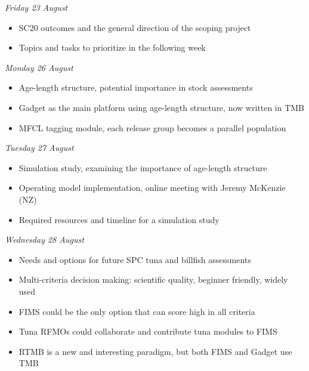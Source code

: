\documentclass{SCreport}
\begin{document}
\vspace{1ex}

\textit{Friday 23 August}\\[-4ex]

\begin{itemize}
  \item[] SC20 outcomes and the general direction of the scoping
  project\\[-4.5ex]
  \item[] Topics and tasks to prioritize in the following week\\[-2.5ex]
\end{itemize}

\textit{Monday 26 August}\\[-4ex]

\begin{itemize}
  \item[] Age-length structure, potential importance in stock
  assessments\\[-4.5ex]
  \item[] Gadget as the main platform using age-length structure, now written in
  TMB\\[-4.5ex]
  \item[] MFCL tagging module, each release group becomes a parallel
  population\\[-2.5ex]
\end{itemize}

\textit{Tuesday 27 August}\\[-4ex]

\begin{itemize}
  \item[] Simulation study, examining the importance of age-length
  structure\\[-4.5ex]
  \item[] Operating model implementation, online meeting with Jeremy McKenzie
  (NZ)\\[-4.5ex]
  \item[] Required resources and timeline for a simulation study\\[-2.5ex]
\end{itemize}

\textit{Wednesday 28 August}\\[-4ex]

\begin{itemize}
  \item[] Needs and options for future SPC tuna and billfish
  assessments\\[-4.5ex]
  \item[] Multi-criteria decision making: scientific quality, beginner friendly,
  widely used\\[-4.5ex]
  \item[] FIMS could be the only option that can score high in all
  criteria\\[-4.5ex]
  \item[] Tuna RFMOs could collaborate and contribute tuna modules to
  FIMS\\[-4.5ex]
  \item[] RTMB is a new and interesting paradigm, but both FIMS and Gadget use
  TMB\\[-2.5ex]
\end{itemize}
\end{document}
